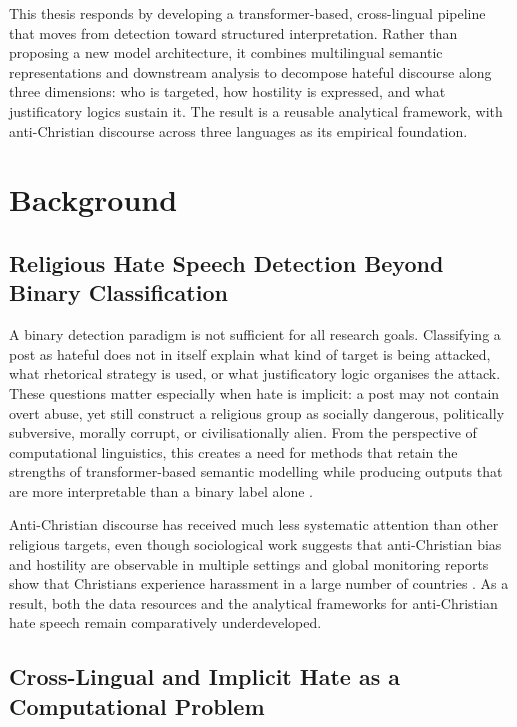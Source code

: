 \documentclass[../CLthesis.tex]{subfiles}
\begin{document}
This thesis responds by developing a transformer-based, cross-lingual pipeline that moves from detection toward structured interpretation. Rather than proposing a new model architecture, it combines multilingual semantic representations and downstream analysis to decompose hateful discourse along three dimensions: who is targeted, how hostility is expressed, and what justificatory logics sustain it. The result is a reusable analytical framework, with anti-Christian discourse across three languages as its empirical foundation.

\section{Background}

\subsection{Religious Hate Speech Detection Beyond Binary Classification}

A binary detection paradigm is not sufficient for all research goals. Classifying a post as hateful does not in itself explain what kind of target is being attacked, what rhetorical strategy is used, or what justificatory logic organises the attack. These questions matter especially when hate is implicit: a post may not contain overt abuse, yet still construct a religious group as socially dangerous, politically subversive, morally corrupt, or civilisationally alien. From the perspective of computational linguistics, this creates a need for methods that retain the strengths of transformer-based semantic modelling while producing outputs that are more interpretable than a binary label alone \citep{elsherief_latent_2021, ollagnier_unsupervised_2023}.

Anti-Christian discourse has received much less systematic attention than other religious targets, even though sociological work suggests that anti-Christian bias and hostility are observable in multiple settings \citep{Yancey2014, scheitle2020} and global monitoring reports show that Christians experience harassment in a large number of countries \citep{pew_rising_restrictions_2019}. As a result, both the data resources and the analytical frameworks for anti-Christian hate speech remain comparatively underdeveloped.

\subsection{Cross-Lingual and Implicit Hate as a Computational Problem}
\end{document}

